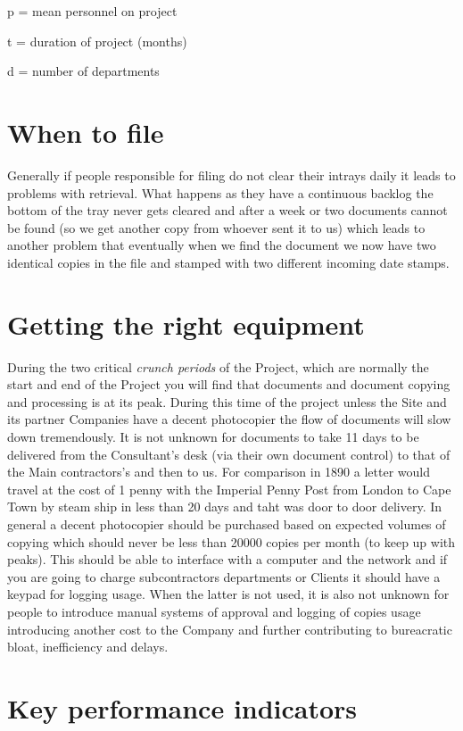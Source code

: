 p = mean personnel on project

t = duration of project (months)

d = number of departments




\section*{When to file}

Generally if people responsible for filing do not clear their intrays daily it leads to problems with retrieval. What happens as they have a continuous backlog the bottom of the tray never gets cleared and after a week or two documents cannot be found (so we get another copy from whoever sent it to us) which leads to another problem that eventually when we find the document we now have two identical copies in the file and 
stamped with two different incoming date stamps.

\section*{Getting the right equipment}

During the two critical \textit{crunch periods} of the Project, which are normally the start and end of the Project you will find that
documents and document copying and processing is at its peak. During this time of the project unless the Site and its partner Companies have a decent photocopier the flow of documents will slow down tremendously. It is not unknown for documents to take 11 days to be delivered from the Consultant's desk (via their own document control) to that of the Main contractors's and then to us. For comparison in 1890 a letter would travel at the cost of 1 penny with the Imperial Penny Post from London to Cape Town by steam ship in less than 20 days and taht was door to door delivery. In general a decent photocopier should be purchased based on expected volumes of copying which should never be less than 20000 copies per month (to keep up with peaks). This should be able to interface with a computer and the network and if you are going to charge subcontractors  departments or Clients it should have a keypad for logging usage. When the latter is not used, it is also not unknown for people to introduce 
manual systems of approval and logging of copies usage introducing another cost to the Company and further contributing to bureacratic bloat, inefficiency and delays. 

\section*{Key performance indicators}


